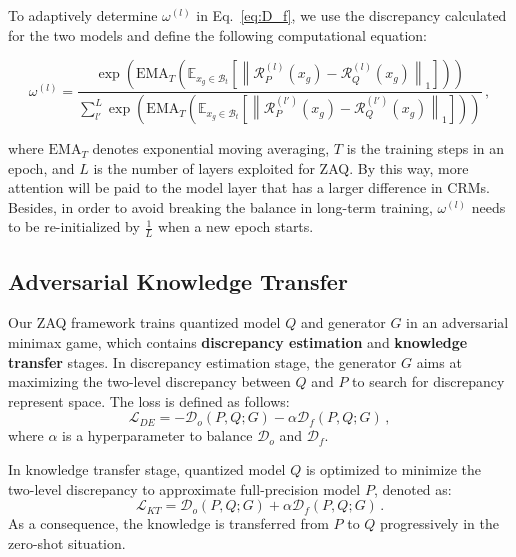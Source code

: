 \documentclass[final]{cvpr}
\begin{document}
To adaptively determine $\omega^{(l)}$ in Eq.~\ref{eq:D_f}, we use the discrepancy calculated for the two models and define the following computational equation:
\begin{smaller}
  \begin{equation}
    \label{eq:adapt_w}
    \omega^{(l)} = \frac{\exp\left(\mathrm{EMA}_{T}\left(\mathbb{E}_{x_g\in\mathcal{B}_t}\left[\left\|\mathcal{R}^{(l)}_{P}(x_g) - \mathcal{R}^{(l)}_{Q}(x_g) \right\|_{1}\right]\right)\right)}{\sum^{L}_{l'}\exp\left(\mathrm{EMA}_{T}\left(\mathbb{E}_{x_g\in\mathcal{B}_t}\left[\left\|\mathcal{R}^{(l')}_{P}(x_g) - \mathcal{R}^{(l')}_{Q}(x_g) \right\|_{1}\right]\right)\right)}\,,
  \end{equation}
\end{smaller}
where $\mathrm{EMA}_{T}$ denotes exponential moving averaging, $T$ is the training steps in an epoch, and $L$ is the number of layers exploited for ZAQ.
By this way, more attention will be paid to the model layer that has a larger difference in CRMs.
Besides, in order to avoid breaking the balance in long-term training, $\omega^{(l)}$ needs to be re-initialized by $\frac{1}{L}$ when a new epoch starts.

\subsection{Adversarial Knowledge Transfer}

Our ZAQ framework trains quantized model $Q$ and generator $G$ in an adversarial minimax game, which contains \textbf{discrepancy estimation} and \textbf{knowledge transfer} stages.
In discrepancy estimation stage, the generator $G$ aims at maximizing the two-level discrepancy between $Q$ and $P$ to search for discrepancy represent space. The loss is defined as follows:
\begin{equation}
  \label{eq:L_DE1}
  \mathcal{L}_{DE} = -\mathcal{D}_{o}(P, Q ; G) - \alpha\mathcal{D}_{f}(P, Q ; G)\,,
\end{equation}
where $\alpha$ is a hyperparameter to balance $\mathcal{D}_{o}$ and $\mathcal{D}_{f}$.

In knowledge transfer stage, quantized model $Q$ is optimized to minimize the two-level discrepancy to approximate full-precision model $P$, denoted as: 
\begin{equation}
  \label{eq:L_KT}
  \mathcal{L}_{KT} = \mathcal{D}_{o}(P, Q ; G) + \alpha\mathcal{D}_{f}(P, Q ; G)\,.
\end{equation}
As a consequence, the knowledge is transferred from $P$ to $Q$ progressively in the zero-shot situation. 
\end{document}
